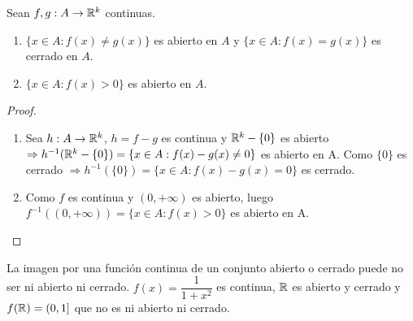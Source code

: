 \clearpage

\begin{corollary}
  Sean \(f, g: A \to \mathbb{R}^k\) continuas.
  \begin{enumerate}
    \item \(\{ x \in A : f(x) \neq g(x) \} \) es abierto en \(A\) y \(\{x \in A: f(x) = g(x)\} \) es cerrado en \(A\).
    \item \(\{x \in A : f(x) > 0\} \) es abierto en \(A\).
  \end{enumerate}
  \begin{proof}
    \begin{enumerate}
      \item Sea \(h: A \to \mathbb{R}^k\), \(h = f - g\) es continua y \(\mathbb{R}^k - \{0\} \) es abierto \(\Rightarrow h^{-1}(\mathbb{R}^k - \{0\}) = \{ x \in A : f(x) - g(x) \neq 0 \} \) es abierto en A. Como \(\{0\} \) es cerrado \(\Rightarrow h^{-1}(\{0\}) = \{ x \in A : f(x) - g(x) = 0\} \) es cerrado.
      \item Como \(f\) es continua y \((0, +\infty)\) es abierto, luego \(f^{-1}((0, +\infty)) = \{x \in A : f(x) > 0\} \) es abierto en A.
    \end{enumerate}
  \end{proof}
\end{corollary}

\begin{note}
  La imagen por una función continua de un conjunto abierto o cerrado puede no ser ni abierto ni cerrado. \(f(x) = \dfrac{1}{1+x^2} \) es continua, \(\mathbb{R} \) es abierto y cerrado y \(f(\mathbb{R}) = (0, 1]\) que no es ni abierto ni cerrado.
\end{note}
